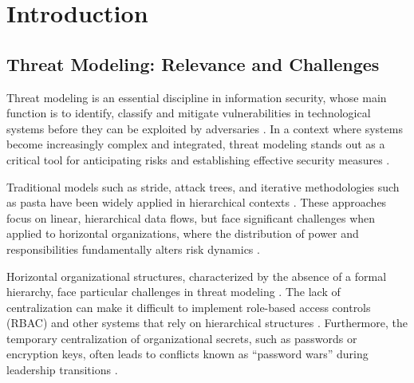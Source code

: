 
%

%

\chapter{Introduction}
\label{cha:introduction}

\section{Threat Modeling: Relevance and Challenges}
\label{sec:threat_modeling_relevance_challenges}

Threat modeling is an essential discipline in information security, whose main
function is to identify, classify and mitigate vulnerabilities in technological
systems before they can be exploited by adversaries
\cite{ThreatModelingdesigningForSecurity,
ThreatModelingASystematicLiteratureReview}. In a context where systems become
increasingly complex and integrated, threat modeling stands out as a critical
tool for anticipating risks and establishing effective security measures
\cite{DemystifyingTheThreatModelingProcess,
ThreatModelingASummaryOfAvailableMethods}.

Traditional models such as \gls{stride}, attack trees, and iterative
methodologies such as \gls{pasta} have been widely applied in hierarchical contexts
\cite{MicrosoftThreatModelingTechnique, AttackTrees, RiskCentricThreatModeling}.
These approaches focus on linear, hierarchical data flows, but face
significant challenges when applied to horizontal organizations, where the
distribution of power and responsibilities fundamentally alters risk dynamics
\cite{EvaluationofCompetingThreatModeling, Colbac}.

Horizontal organizational structures, characterized by the absence of a formal
hierarchy, face particular challenges in threat modeling \cite{Colbac}. The lack of
centralization can make it difficult to implement role-based access controls
(RBAC) and other systems that rely on hierarchical structures \cite{Colbac}. Furthermore, the
temporary centralization of organizational secrets, such as passwords or
encryption keys, often leads to conflicts known as “password wars” during
leadership transitions \cite{FromCounterpublicstoContentious}.

